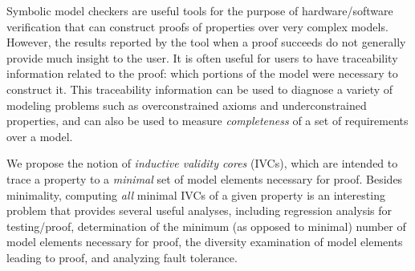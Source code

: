 Symbolic model checkers are useful tools for the purpose of hardware/software verification that can construct proofs of properties over
very complex models. However, the results reported by the tool
when a proof succeeds do not generally provide much insight to
the user. It is often useful for users to have traceability information related to the proof: which portions of the model were necessary to construct it.  This traceability information can be used to diagnose a variety of modeling problems such as overconstrained axioms and underconstrained properties, and can also be used to measure {\em completeness} of a set of requirements over a model.

We propose the notion of {\em inductive validity cores} (IVCs), which are intended to trace a property to a \emph{minimal} set of model elements necessary for proof. Besides minimality, computing \emph{all} minimal IVCs of a given property is
an interesting problem that provides several useful analyses, including
regression analysis for testing/proof, determination of the minimum (as
opposed to minimal) number of model elements necessary for proof, the
diversity examination of model elements leading to proof, and analyzing fault
tolerance.
